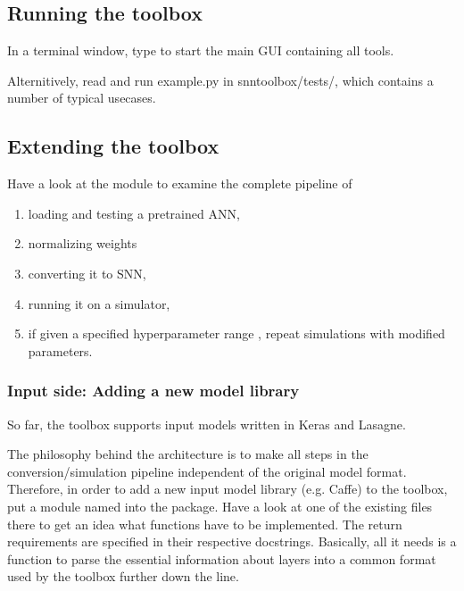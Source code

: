 \documentclass[letterpaper,10pt,english]{sphinxmanual}
\begin{document}
\subsection{Running the toolbox}
\label{getting_started:running-the-toolbox}
In a terminal window, type  to start the main GUI containing all tools.

Alternitively, read and run example.py in snntoolbox/tests/, which contains a number of typical usecases.


\subsection{Extending the toolbox}
\label{getting_started:extending-the-toolbox}
Have a look at the  module to examine the complete pipeline of
\begin{enumerate}
\item {} 
loading and testing a pretrained ANN,

\item {} 
normalizing weights

\item {} 
converting it to SNN,

\item {} 
running it on a simulator,

\item {} 
if given a specified hyperparameter range ,
repeat simulations with modified parameters.

\end{enumerate}


\subsubsection{Input side: Adding a new model library}
\label{getting_started:input-side-adding-a-new-model-library}
So far, the toolbox supports input models written in Keras and Lasagne.

The philosophy behind the architecture is to make all steps in the conversion/simulation
pipeline independent of the original model format. Therefore, in order to add a
new input model library (e.g. Caffe) to the toolbox, put a module named 
into the  package. Have a look at one of the existing files there to get an idea
what functions have to be implemented. The return requirements are specified in their
respective docstrings. Basically, all it needs is a function to parse the essential
information about layers into a common format used by the toolbox further down the line.
\end{document}
